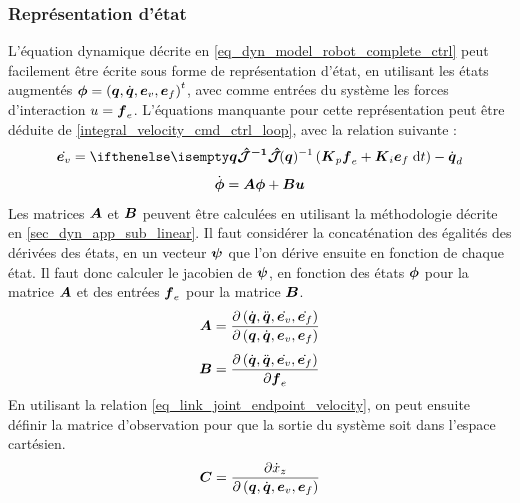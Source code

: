 \documentclass[12pt, a4paper]{article} %
\numberwithin{equation}{section}
\begin{document}
	\subsubsection{Représentation d'état} \label{sec_dyn_app_sub_state_sys}
	L'équation dynamique décrite en \cref{eq_dyn_model_robot_complete_ctrl} peut facilement être écrite sous forme de représentation d'état, en utilisant les états augmentés $ \vect{\phi} = \left(\vect{q}, \dot{\vect{q}}, \vect{e}_v, \vect{e}_f \right)^t $, avec comme entrées du système les forces d'interaction $ u =\vect{f}_e $.
	L'équations manquante pour cette représentation peut être déduite de \cref{integral_velocity_cmd_ctrl_loop}, avec la relation suivante :
	\begin{equation} 
		\dot{\vect{e}_v} = \jacobianHat{\vect{q}}{}{-1}\left( \matr{K}_p \vect{f}_e + \matr{K}_i \vect{e}_f \; \mathrm{d}t \right) - \dot{\vect{q}}_d
	\end{equation}
	\begin{equation}
		\dot{\vect{\phi}} = \matr{A} \vect{\phi} + \matr{B} \vect{u}
	\end{equation}
	Les matrices $ \matr{A} $ et $ \matr{B} $ peuvent être calculées en utilisant la méthodologie décrite en \cref{sec_dyn_app_sub_linear}. Il faut considérer la concaténation des égalités des dérivées des états, en un vecteur $ \vect{\psi} $ que l'on dérive ensuite en fonction de chaque état. Il faut donc calculer le jacobien de $ \vect{\psi} $, en fonction des états $ \vect{\phi} $ pour la matrice $ \matr{A} $ et des entrées $ \vect{f}_e $ pour la matrice $ \matr{B} $.
	\begin{equation} \label{eq_dynamic_ss_A}
		\matr{A} = \frac{\partial \left( \dot{\vect{q}}, \ddot{\vect{q}}, \dot{\vect{e}_v}, \dot{\vect{e}_f} \right)}{\partial \left(\vect{q}, \dot{\vect{q}}, \vect{e}_v, \vect{e}_f \right)}
	\end{equation}
	\begin{equation} \label{eq_dynamic_ss_B}
		\matr{B} = \frac{\partial \left( \dot{\vect{q}}, \ddot{\vect{q}}, \dot{\vect{e}_v}, \dot{\vect{e}_f} \right)}{\partial \vect{f}_e }
	\end{equation}
	En utilisant la relation \cref{eq_link_joint_endpoint_velocity}, on peut ensuite définir la matrice d'observation pour que la sortie du système soit dans l'espace cartésien.
	\begin{equation} \label{eq_dynamic_ss_C}
		\matr{C} = \frac{\partial \dot{x}_z }{ \partial \left(\vect{q}, \dot{\vect{q}}, \vect{e}_v, \vect{e}_f \right) }
	\end{equation}
\end{document}
